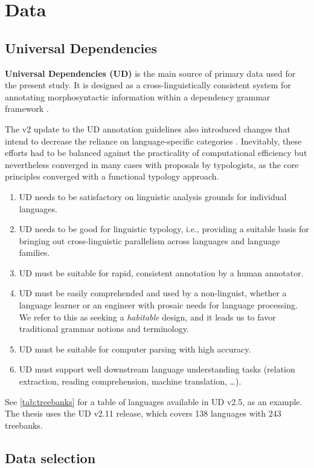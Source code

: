 \chapter{Data}\label{chapter:data}

\section{Universal Dependencies}\label{sec:data_ud}

\textbf{Universal Dependencies (UD)} is the main source of primary data used for the present study. It is designed as a cross-linguistically consistent system for annotating morphosyntactic information within a dependency grammar framework \citep{demarneffe2021}. 

The v2 update to the UD annotation guidelines also introduced changes that intend to decrease the reliance on language-specific categories \citep{nivre2020}. Inevitably, these efforts had to be balanced against the practicality of computational efficiency but nevertheless converged in many cases with proposals by typologists, as the core principles converged with a functional typology approach. \citet{croft2017}

\begin{enumerate}
    \item UD needs to be satisfactory on linguistic analysis grounds for individual languages.
    \item UD needs to be good for linguistic typology, i.e., providing a suitable basis for bringing out cross-linguistic parallelism across languages and language families.
    \item UD must be suitable for rapid, consistent annotation by a human annotator.
    \item UD must be easily comprehended and used by a non-linguist, whether a language learner or an engineer with prosaic needs for language processing. We refer to this as seeking a \textit{habitable} design, and it leads us to favor traditional grammar notions and terminology.
    \item UD must be suitable for computer parsing with high accuracy.
    \item UD must support well downstream language understanding tasks (relation extraction, reading comprehension, machine translation, \dots).
\end{enumerate}

See \ref{tab:treebanks} for a table of languages available in UD v2.5, as an example. The thesis uses the UD v2.11 release, which covers 138 languages with 243 treebanks.



\section{Data selection}\label{sec:data_selection}

